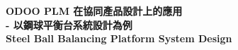 \documentclass[12pt,a4paper]{report}  %
\begin{document}
\sectionef %
\vspace{12em}
\begin{titlepage}%
\begin{center}   %
\\[18pt]
\\[18pt]
\sectionef\fontsize{24pt}{1em}\selectfont\textbf
{
\vspace{0.5em}
ODOO PLM 在協同產品設計上的應用}\\[18pt]
\vspace{1em} %
\fontsize{24pt}{1pt}\selectfont\textbf{- 以鋼球平衡台系統設計為例}\\
\vspace{1em}
\sectionef\fontsize{24pt}{1em}\selectfont\textbf
{
\vspace{0.5em}
Steel Ball Balancing Platform System Design}
 \vspace{1em}
\end{center}
\begin{flushleft}
\begin{LARGE}


\end{LARGE}
\end{flushleft}
\end{titlepage}
\end{document}
